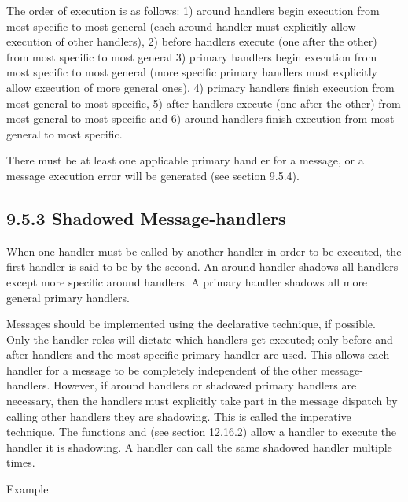 \documentclass[letterpaper,10pt,english]{sphinxmanual}
\begin{document}
The order of execution is as follows: 1) around handlers begin execution
from most specific to most general (each around handler must explicitly
allow execution of other handlers), 2) before handlers execute (one
after the other) from most specific to most general 3) primary handlers
begin execution from most specific to most general (more specific
primary handlers must explicitly allow execution of more general ones),
4) primary handlers finish execution from most general to most specific,
5) after handlers execute (one after the other) from most general to
most specific and 6) around handlers finish execution from most general
to most specific.

There must be at least one applicable primary handler for a message, or
a message execution error will be generated (see section 9.5.4).


\subsection{9.5.3 Shadowed Message-handlers}
\label{\detokenize{cool:shadowed-message-handlers}}
When one handler must be called by another handler in order to be
executed, the first handler is said to be  by the second. An
around handler shadows all handlers except more specific around
handlers. A primary handler shadows all more general primary handlers.

Messages should be implemented using the declarative technique, if
possible. Only the handler roles will dictate which handlers get
executed; only before and after handlers and the most specific primary
handler are used. This allows each handler for a message to be
completely independent of the other message-handlers. However, if around
handlers or shadowed primary handlers are necessary, then the handlers
must explicitly take part in the message dispatch by calling other
handlers they are shadowing. This is called the imperative technique.
The functions  and  (see
section 12.16.2) allow a handler to execute the handler it is shadowing.
A handler can call the same shadowed handler multiple times.

Example
\end{document}

